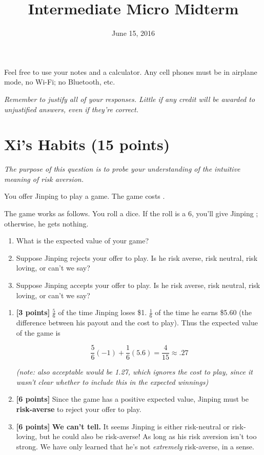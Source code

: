 \documentclass{article}
\newenvironment{solution}{\color{red}}{\color{black}}
\begin{document}
\title{Intermediate Micro Midterm}

\date{June 15, 2016}

\maketitle

Feel free to use your notes and a calculator. Any cell phones must be in airplane mode, no Wi-Fi; no Bluetooth, etc.	

\textit{Remember to justify all of your responses. Little if any credit will be awarded to unjustified answers, even if they're correct.}

\section*{Xi's Habits (15 points)}

\small{\textit{The purpose of this question is to probe your understanding of the intuitive meaning of risk aversion.}}

You offer Jinping to play a game. The game costs .

The game works as follows. You roll a dice. If the roll is a 6, you'll give Jinping ; otherwise, he gets nothing.

\begin{enumerate}
\item What is the expected value of your game?

\item Suppose Jinping rejects your offer to play. Is he risk averse, risk neutral, risk loving, or can't we say?
	
\item Suppose Jinping accepts your offer to play. Is he risk averse, risk neutral, risk loving, or can't we say? 
\end{enumerate}

\begin{solution}
\begin{enumerate}
\item \textbf{[3 points]} $\frac56$ of the time Jinping loses \$1. $\frac16$ of the time he earns \$5.60 (the difference between his payout and the cost to play). Thus the expected value of the game is

\[ \frac56 (-1) + \frac16 (5.6) = \frac4{15} \approx .27\]

\emph{(note: also acceptable would be 1.27, which ignores the cost to play, since it wasn't clear whether to include this in the expected winnings)}

\item \textbf{[6 points]} Since the game has a positive expected value, Jinping must be \textbf{risk-averse} to reject your offer to play.

\item \textbf{[6 points]} \textbf{We can't tell.} It seems Jinping is either risk-neutral or risk-loving, but he could also be risk-averse! As long as his risk aversion isn't too strong. We have only learned that he's not \emph{extremely} risk-averse, in a sense.
\end{enumerate}
\end{solution}
\end{document}
